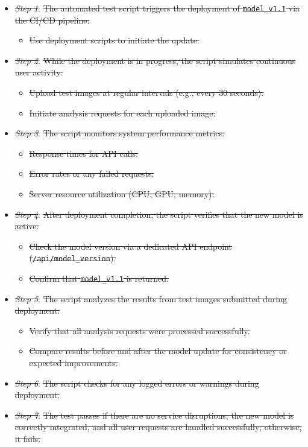 \documentclass[12pt, titlepage]{article}
\begin{document}
\begin{enumerate}
\begin{itemize}
  \item[-] \textit{\sout{Step 1}}: \sout{The automated test script triggers the deployment of \texttt{model\_v1.1} via the CI/CD pipeline:}
    \begin{itemize}
      \item \sout{Use deployment scripts to initiate the update.}
    \end{itemize}
  \item[-] \textit{\sout{Step 2}}: \sout{While the deployment is in progress, the script simulates continuous user activity:}
    \begin{itemize}
      \item \sout{Upload test images at regular intervals (e.g., every 30 seconds).}
      \item \sout{Initiate analysis requests for each uploaded image.}
    \end{itemize}
  \item[-] \textit{\sout{Step 3}}: \sout{The script monitors system performance metrics:}
    \begin{itemize}
      \item \sout{Response times for API calls.}
      \item \sout{Error rates or any failed requests.}
      \item \sout{Server resource utilization (CPU, GPU, memory).}
    \end{itemize}
  \item[-] \textit{\sout{Step 4}}: \sout{After deployment completion, the script verifies that the new model is active:}
    \begin{itemize}
      \item \sout{Check the model version via a dedicated API endpoint (\texttt{/api/model\_version}).}
      \item \sout{Confirm that \texttt{model\_v1.1} is returned.}
    \end{itemize}
  \item[-] \textit{\sout{Step 5}}: \sout{The script analyzes the results from test images submitted during deployment:}
    \begin{itemize}
      \item \sout{Verify that all analysis requests were processed successfully.}
      \item \sout{Compare results before and after the model update for consistency or expected improvements.}
    \end{itemize}
  \item[-] \textit{\sout{Step 6}}: \sout{The script checks for any logged errors or warnings during deployment.}
  \item[-] \textit{\sout{Step 7}}: \sout{The test passes if there are no service disruptions, the new model is correctly integrated, and all user requests are handled successfully; otherwise, it fails.}
\end{itemize}
\end{enumerate}
\end{document}
